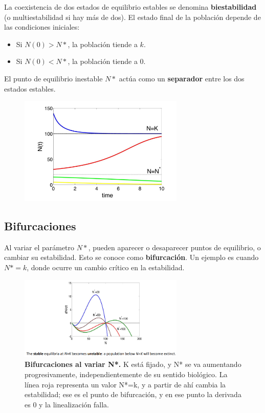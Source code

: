 La coexistencia de dos estados de equilibrio estables se denomina \textbf{biestabilidad} (o multiestabilidad si hay más de dos). El estado final de la población depende de las condiciones iniciales:
\begin{itemize}
\item Si $N(0) > N*$, la población tiende a $k$.
\item Si $N(0) < N*$, la población tiende a 0.
\end{itemize}

El punto de equilibrio inestable $N*$ actúa como un \textbf{separador} entre los dos estados estables.

\begin{figure}[h]
\centering
\includegraphics[width = 0.7\textwidth]{figs/bistability.png}
\end{figure}

\subsection{Bifurcaciones}
Al variar el parámetro $N*$, pueden aparecer o desaparecer puntos de equilibrio, o cambiar su estabilidad. Esto se conoce como \textbf{bifurcación}. Un ejemplo es cuando $N* = k$, donde ocurre un cambio crítico en la estabilidad.

\begin{figure}[h]
\centering
\includegraphics[width = 0.7\textwidth]{figs/bistability-bifurcations.png}
\caption{\textbf{Bifurcaciones al variar N*.} K está fijado, y N* se va aumentando progresivamente, independientemente de su sentido biológico. La línea roja representa un valor N*=k, y a partir de ahí cambia la estabilidad; ese es el punto de bifurcación, y en ese punto la derivada es 0 y la linealización falla.}
\end{figure}

